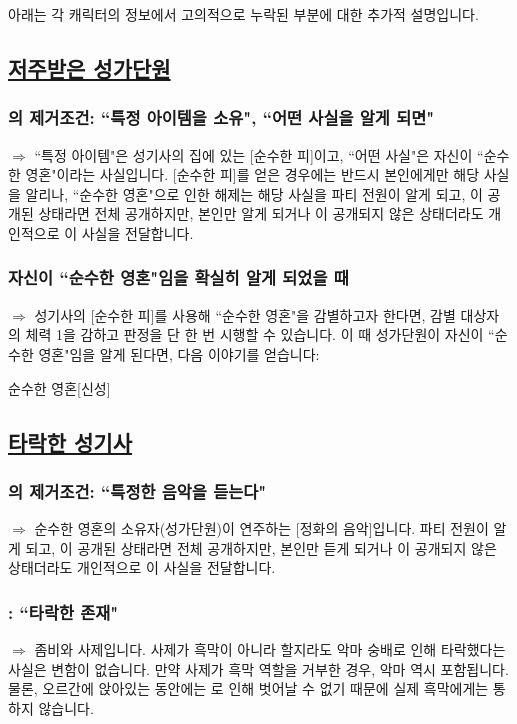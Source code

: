 \documentclass{report}
\begin{document}
	아래는 각 캐릭터의 정보에서 고의적으로 누락된 부분에 대한 추가적 설명입니다.
	
	\subsection*{\large \hyperlink{cursed-bard}{저주받은 성가단원}}
		\subsubsection*{\normalsize {}의 제거조건: ``특정 아이템을 소유", ``어떤 사실을 알게 되면"}
			$\Rightarrow$ ``특정 아이템"은 성기사의 집에 있는 [순수한 피]이고, ``어떤 사실"은 자신이 ``순수한 영혼"이라는 사실입니다. [순수한 피]를 얻은 경우에는 반드시 본인에게만 해당 사실을 알리나, ``순수한 영혼"으로 인한 해제는 해당 사실을 파티 전원이 알게 되고, 이 공개된 상태라면 전체 공개하지만, 본인만 알게 되거나 이 공개되지 않은 상태더라도 개인적으로 이 사실을 전달합니다.
		
		\subsubsection*{\normalsize 자신이 ``순수한 영혼"임을 확실히 알게 되었을 때}
			$\Rightarrow$ 성기사의 [순수한 피]를 사용해 ``순수한 영혼"을 감별하고자 한다면, 감별 대상자의 체력 1을 감하고 판정을 단 한 번 시행할 수 있습니다. 이 때 성가단원이 자신이 ``순수한 영혼"임을 알게 된다면, 다음 이야기를 얻습니다:
			\begin{spoiler}{순수한 영혼}{[신성]}
			\end{spoiler}
	
	\subsection*{\large \hyperlink{corrupt-paladin}{타락한 성기사}}
		\subsubsection*{\normalsize {}의 제거조건: ``특정한 음악을 듣는다"}
			$\Rightarrow$ 순수한 영혼의 소유자(성가단원)이 연주하는 [정화의 음악]입니다. 파티 전원이 알게 되고, 이 공개된 상태라면 전체 공개하지만, 본인만 듣게 되거나 이 공개되지 않은 상태더라도 개인적으로 이 사실을 전달합니다.
			
		\subsubsection*{\normalsize {}: ``타락한 존재"}
			$\Rightarrow$ 좀비와 사제입니다. 사제가 흑막이 아니라 할지라도 악마 숭배로 인해 타락했다는 사실은 변함이 없습니다. 만약 사제가 흑막 역할을 거부한 경우, 악마 역시 포함됩니다. 물론, 오르간에 앉아있는 동안에는 로 인해 벗어날 수 없기 때문에 실제 흑막에게는 통하지 않습니다.
\end{document}
